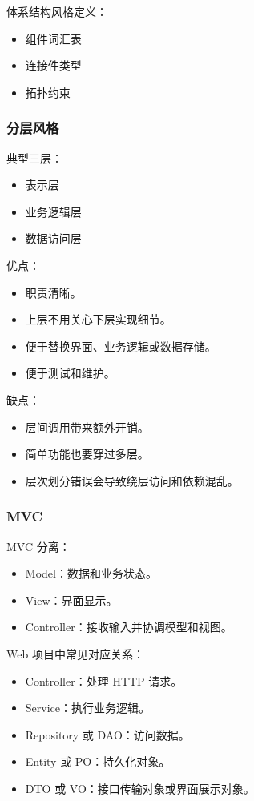 \documentclass[UTF8,zihao=-4]{ctexart}
\begin{document}
体系结构风格定义：

\begin{itemize}
\item 组件词汇表
\item 连接件类型
\item 拓扑约束
\end{itemize}

\subsubsection{分层风格}

典型三层：

\begin{itemize}
\item 表示层
\item 业务逻辑层
\item 数据访问层
\end{itemize}

优点：

\begin{itemize}
\item 职责清晰。
\item 上层不用关心下层实现细节。
\item 便于替换界面、业务逻辑或数据存储。
\item 便于测试和维护。
\end{itemize}

缺点：

\begin{itemize}
\item 层间调用带来额外开销。
\item 简单功能也要穿过多层。
\item 层次划分错误会导致绕层访问和依赖混乱。
\end{itemize}

\subsubsection{MVC}

MVC 分离：

\begin{itemize}
\item Model：数据和业务状态。
\item View：界面显示。
\item Controller：接收输入并协调模型和视图。
\end{itemize}

Web 项目中常见对应关系：

\begin{itemize}
\item Controller：处理 HTTP 请求。
\item Service：执行业务逻辑。
\item Repository 或 DAO：访问数据。
\item Entity 或 PO：持久化对象。
\item DTO 或 VO：接口传输对象或界面展示对象。
\end{itemize}
\end{document}
